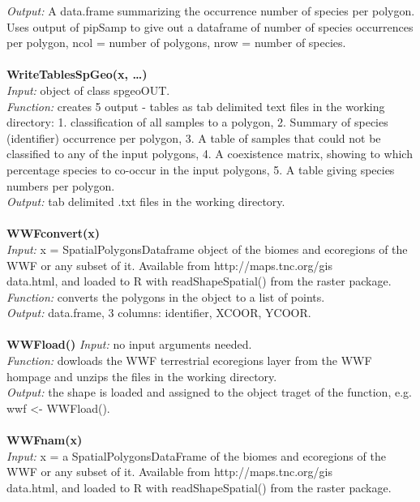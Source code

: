 \documentclass[a4paper,titlepage,11pt]{scrreprt}
\begin{document}
\textit{Output:} A data.frame summarizing the occurrence number of species per polygon.\\
Uses output of pipSamp to give out a dataframe of number of species occurrences per polygon, ncol = number of polygons, nrow = number of species.\\
\\
\textbf{WriteTablesSpGeo(x, \dots)}\\
\textit{Input:} object of class spgeoOUT.\\
\textit{Function:} creates 5 output - tables as tab delimited text files in the working directory: 1. classification of all samples to a polygon, 2. Summary of species (identifier) occurrence per polygon, 3. A table of samples that could not be classified to any of the input polygons, 4. A coexistence matrix, showing to which percentage species to co-occur in the input polygons, 5. A table giving species numbers per polygon.\\
\textit{Output:} tab delimited .txt files in the working directory.\\
\\
\textbf{WWFconvert(x)}\\
\textit{Input:} x = SpatialPolygonsDataframe object of the biomes and ecoregions of the WWF or any subset of it. Available from http://maps.tnc.org/gis\\data.html, and loaded to R with readShapeSpatial() from the raster package.\\
\textit{Function:} converts the polygons in the object to a list of points.\\
\textit{Output:} data.frame, 3 columns: identifier, XCOOR, YCOOR.\\
\\
\textbf{WWFload()}
\textit{Input:} no input arguments needed.\\
\textit{Function:} dowloads the WWF terrestrial ecoregions layer \citep{olson2001} from the WWF hompage and unzips the files in the working directory.\\
\textit{Output:} the shape is loaded and assigned to the object traget of the function, e.g. wwf \textless- WWFload().\\
\\
\textbf{WWFnam(x)}\\
\textit{Input:} x = a SpatialPolygonsDataFrame of the biomes and ecoregions of the WWF or any subset of it. Available from http://maps.tnc.org/gis\\data.html, and loaded to R with readShapeSpatial() from the raster package.\\
\end{document}
